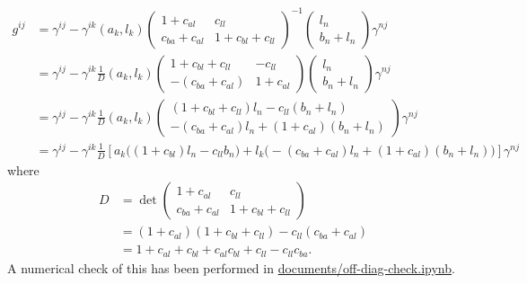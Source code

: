 \documentclass{article}
\begin{document}
\begin{align*}
    g^{ij} 
    &= \gamma^{ij} - \gamma^{ik} (a_k, l_k) \begin{pmatrix}
            1 + c_{al} & c_{ll} \\
            c_{ba} + c_{al} & 1 + c_{bl} + c_{ll}
       \end{pmatrix}^{-1} \begin{pmatrix} l_n \\ b_n + l_n \end{pmatrix} \gamma^{nj} \\
    &= \gamma^{ij} - \gamma^{ik} \frac{1}{D} (a_k, l_k) \begin{pmatrix}
            1 + c_{bl} + c_{ll} & -c_{ll} \\
            -(c_{ba} + c_{al}) & 1 + c_{al}
       \end{pmatrix} \begin{pmatrix} l_n \\ b_n + l_n \end{pmatrix} \gamma^{nj} \\
    &= \gamma^{ij} - \gamma^{ik} \frac{1}{D} (a_k, l_k) \begin{pmatrix}
            (1 + c_{bl} + c_{ll}) l_n - c_{ll} (b_n + l_n) \\
            -(c_{ba} + c_{al}) l_n + (1 + c_{al}) (b_n + l_n)
       \end{pmatrix} \gamma^{nj} \\
    &= \gamma^{ij} - \gamma^{ik} \frac{1}{D} \left[ a_k \big( (1 + c_{bl}) l_n - c_{ll} b_n \big) + l_k \big( -(c_{ba} + c_{al}) l_n + (1 + c_{al}) (b_n + l_n) \big) \right] \gamma^{nj}
\end{align*}
where
\begin{align*}
    D 
    &= \det
    \begin{pmatrix}
        1 + c_{al} & c_{ll} \\
        c_{ba} + c_{al} & 1 + c_{bl} + c_{ll}
    \end{pmatrix} \\
    &= (1 + c_{al})(1 + c_{bl} + c_{ll}) - c_{ll} (c_{ba} + c_{al}) \\
    &= 1 + c_{al} + c_{bl} + c_{al} c_{bl} + c_{ll} - c_{ll} c_{ba}.
\end{align*}
A numerical check of this has been performed in 
\href{https://github.com/Noah-Everett/Induced-Metric-Optimiser/blob/main/documents/off-diag-check.ipynb}{documents/off-diag-check.ipynb}.
\end{document}
